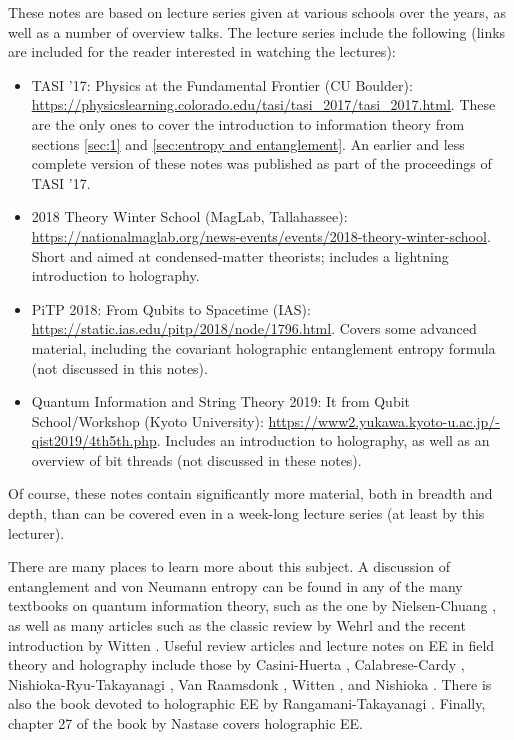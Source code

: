 \documentclass[11pt]{article}
\begin{document}
These notes are based on lecture series given at various schools over the years, as well as a number of overview talks. The lecture series include the following (links are included for the reader interested in watching the lectures):
\begin{itemize}
\item TASI '17: Physics at the Fundamental Frontier (CU Boulder): \\ \href{https://physicslearning.colorado.edu/tasi/tasi_2017/tasi_2017.html}{https://physicslearning.colorado.edu/tasi/tasi\_2017/tasi\_2017.html}. These are the only ones to cover the introduction to information theory from sections \ref{sec:1} and \ref{sec:entropy and entanglement}. An earlier and less complete version of these notes was published as part of the proceedings of TASI '17.
\item 2018 Theory Winter School (MagLab, Tallahassee): \href{https://nationalmaglab.org/news-events/events/2018-theory-winter-school}{https://nationalmaglab.org/news-events/events/2018-theory-winter-school}. Short and aimed at condensed-matter theorists; includes a lightning introduction to holography.
\item PiTP 2018: From Qubits to Spacetime (IAS):\\ \href{https://static.ias.edu/pitp/2018/node/1796.html}{https://static.ias.edu/pitp/2018/node/1796.html}. Covers some advanced material, including the covariant holographic entanglement entropy formula (not discussed in this notes).
\item Quantum Information and String Theory 2019: It from Qubit School/Workshop (Kyoto University): \href{https://www2.yukawa.kyoto-u.ac.jp/~qist2019/4th5th.php}{https://www2.yukawa.kyoto-u.ac.jp/-qist2019/4th5th.php}. Includes an introduction to holography, as well as an overview of bit threads (not discussed in these notes).
\end{itemize}
Of course, these notes contain significantly more material, both in breadth and depth, than can be covered even in a week-long lecture series (at least by this lecturer).

There are many places to learn more about this subject.  A discussion of entanglement and von Neumann entropy can be found in any of the many textbooks on quantum information theory, such as the one by Nielsen-Chuang \cite{NielsenChuang}, as well as many articles such as the classic review by Wehrl \cite{Wehrl} and the recent introduction by Witten \cite{Witten:2018zva}. Useful review articles and lecture notes on EE in field theory and holography include those by Casini-Huerta \cite{Casini:2009sr}, Calabrese-Cardy \cite{Calabrese:2009qy}, Nishioka-Ryu-Takayanagi \cite{Nishioka:2009un}, Van Raamsdonk \cite{VanRaamsdonk:2016exw}, Witten \cite{Witten:2018lha}, and Nishioka \cite{Nishioka:2018khk}. There is also the book devoted to holographic EE by Rangamani-Takayanagi \cite{Rangamani:2016dms}. Finally, chapter 27 of the book by Nastase \cite{Nastase:2015wjb} covers holographic EE.
\end{document}
